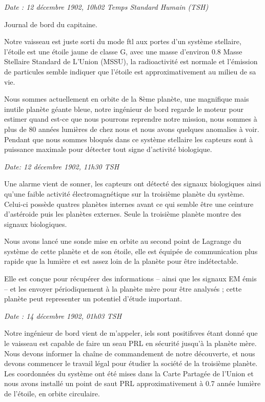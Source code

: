 \documentclass[12pt,hidelinks,a4paper]{book}
\renewcommand{\cdot}{\textbullet}
\begin{document}
\textit{Date : 12 décembre 1902, 10h02 Temps Standard Humain (TSH)}\par
\bigskip

Journal de bord du capitaine.\par
\bigskip
Notre vaisseau est juste sorti du mode \gls{ftl} aux portes d'un
système stellaire, l'étoile est une étoile jaune de classe G, avec
une masse d'environ 0.8 Masse Stellaire Standard de L'Union (MSSU),
la radioactivité est normale et l'émission de particules semble indiquer
que l'étoile est approximativement au milieu de sa vie.

\bigskip
Nous sommes actuellement en orbite de la 8ème planète, une magnifique
mais inutile planète géante bleue, notre ingénieur de bord regarde
le moteur pour estimer quand est-ce que nous pourrons reprendre notre
mission, nous sommes à plus de 80 années lumières de chez nous et
nous avons quelques anomalies à voir. Pendant que nous sommes bloqués
dans ce système stellaire les capteurs sont à puissance maximale pour
détecter tout signe d'activité biologique.\par 
\bigskip

\textit{Date: 12 décembre 1902, 11h30 TSH}\par 
\bigskip

Une alarme vient de sonner, les capteurs ont détecté des signaux biologiques
ainsi qu'une faible activité électromagnétique sur la troisième planète
du système. Celui-ci possède quatres planètes internes avant ce qui
semble être une ceinture d'astéroide puis les planètes externes. Seule
la troisième planète montre des signaux biologiques.\par
\bigskip

Nous avons lancé une sonde mise en orbite au second point de Lagrange
du système de cette planète et de son étoile, elle est équipée de
communication plus rapide que la lumière et est assez loin de la planète
pour être indétectable.\par
\bigskip

Elle est conçue pour récupérer des informations -- ainsi que les
signaux EM émis -- et les envoyer périodiquement à la planète mère
pour être analysés ; cette planète peut representer un potentiel d'étude
important.\par
\bigskip

\textit{Date : 14 décembre 1902, 01h03 TSH}\par

Notre ingénieur de bord vient de m'appeler, iels sont positifs\cdot ves
étant donné que le vaisseau est capable de faire un seau PRL en sécurité
jusqu'à la planète mère. Nous devons informer la chaîne de commandement
de notre découverte, et nous devons commencer le travail légal pour
étudier la société de la troisième planète. Les coordonnées du système
ont été mises dans la Carte Partagée de l'Union et nous avons installé
un point de saut PRL approximativement à 0.7 année lumière de l'étoile,
en orbite circulaire.\par
\end{document}
